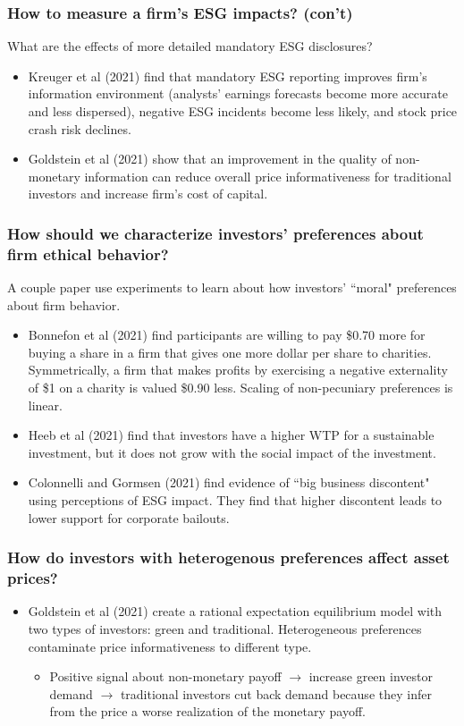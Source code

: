 \documentclass[usenames,dvipsnames, handout]{beamer}
\begin{document}
\begin{frame}
\frametitle{How to measure a firm's ESG impacts? (con't)} 
What are the effects of more detailed mandatory ESG disclosures?
\bigskip
\begin{itemize}[<+->]
\item Kreuger et al (2021) find that mandatory ESG reporting improves firm's information
environment (analysts' earnings forecasts become more accurate and less dispersed), negative ESG incidents become less likely, and stock price crash risk declines.
\bigskip
\item Goldstein et al (2021) show that an improvement in
the quality of non-monetary information can reduce overall price informativeness for traditional investors
and increase firm's cost of capital. 
\end{itemize}
\hyperlink{mq}{}
\end{frame}



\begin{frame}[label=q_2]
\frametitle{How should we characterize investors' preferences about firm ethical behavior?}
A couple paper use experiments to learn about how investors' ``moral" preferences about firm behavior.
\bigskip
\begin{itemize}[<+->]
\item Bonnefon et al (2021) find participants are willing to pay \$0.70 more for buying a share in a firm that gives one more dollar per share to charities. Symmetrically, a firm that makes profits by exercising a negative externality of \$1 on a charity is valued \$0.90 less. Scaling of non-pecuniary preferences is linear.
\bigskip
\item Heeb et al (2021) find that investors have a higher WTP for a sustainable investment, but it does not grow with the social impact of the investment.
\bigskip
\item Colonnelli and Gormsen (2021) find evidence of ``big business discontent" using perceptions of ESG impact.  They find that higher discontent leads to lower support for corporate bailouts.
\end{itemize}
\hyperlink{mq}{}
\end{frame}


\begin{frame}[label=q_3]
\frametitle{How do investors with heterogenous preferences affect asset prices?}
\bigskip
\begin{itemize}[<+->]
\item Goldstein et al (2021) create a rational expectation equilibrium model with two types of investors: green and traditional. Heterogeneous preferences contaminate price informativeness to different type.  
\begin{itemize}
\item Positive signal about non-monetary payoff $\rightarrow$ increase green investor demand $\rightarrow$ traditional investors cut back demand because they infer from  the price a worse realization of the monetary payoff.
\end{itemize}
\end{itemize}
\end{frame}
\end{document}
